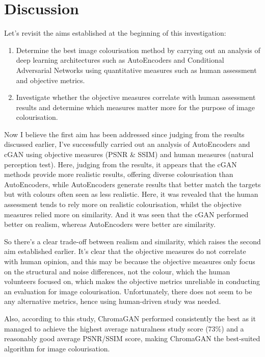 \pagebreak
\section{Discussion}
Let's revisit the aims established at the beginning of this investigation:

\begin{enumerate}
  \item Determine the best image colourisation method by carrying out an analysis of deep learning architectures such as AutoEncoders and Conditional Adversarial Networks using quantitative measures such as human assessment and objective metrics.
  \item Investigate whether the objective measures correlate with
human assessment results and determine which measures matter more for the purpose of image colourisation.
\end{enumerate}

Now I believe the first aim has been addressed since judging from the results discussed earlier, I've successfully carried out an analysis of AutoEncoders and cGAN using objective measures (PSNR & SSIM) and human measures (natural perception test). Here, judging from the results, it appears that the cGAN methods provide more realistic results, offering diverse colourisation than AutoEncoders, while AutoEncoders generate results that better match the targets but with colours often seen as less realistic. Here, it was revealed that the human assessment tends to rely more on realistic colourisation, whilst the objective measures relied more on similarity. And it was seen that the cGAN performed better on realism, whereas AutoEncoders were better are similarity.

So there's a clear trade-off between realism and similarity, which raises the second aim established earlier. It's clear that the objective measures do not correlate with human opinion, and this may be because the objective measures only focus on the structural and noise differences, not the colour, which the human volunteers focused on, which makes the objective metrics unreliable in conducting an evaluation for image colourisation. Unfortunately, there does not seem to be any alternative metrics, hence using human-driven study was needed.   

Also, according to this study, ChromaGAN performed consistently the best as it managed to achieve the highest average naturalness study score (73\%) and a reasonably good average PSNR/SSIM score, making ChromaGAN the best-suited algorithm for image colourisation.




